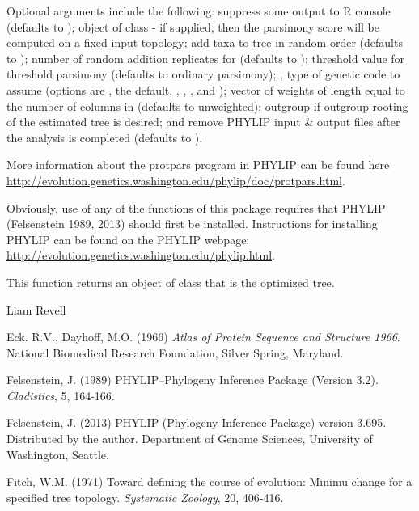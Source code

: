 \documentclass[a4paper]{book}
\begin{document}
\begin{Details}\relax
Optional arguments include the following:  suppress some output to R console (defaults to );  object of class  - if supplied, then the parsimony score will be computed on a fixed input topology;  add taxa to tree in random order (defaults to );  number of random addition replicates for  (defaults to );  threshold value for threshold parsimony (defaults to ordinary parsimony); , type of genetic code to assume (options are , the default, , , , and );  vector of weights of length equal to the number of columns in  (defaults to unweighted);  outgroup if outgroup rooting of the estimated tree is desired; and  remove PHYLIP input \& output files after the analysis is completed (defaults to ).

More information about the protpars program in PHYLIP can be found here \url{http://evolution.genetics.washington.edu/phylip/doc/protpars.html}.

Obviously, use of any of the functions of this package requires that PHYLIP (Felsenstein 1989, 2013) should first be installed. Instructions for installing PHYLIP can be found on the PHYLIP webpage: \url{http://evolution.genetics.washington.edu/phylip.html}.
\end{Details}
%
\begin{Value}
This function returns an object of class  that is the optimized tree.
\end{Value}
%
\begin{Author}\relax
Liam Revell 
\end{Author}
%
\begin{References}\relax
Eck. R.V., Dayhoff, M.O. (1966) \emph{Atlas of Protein Sequence and Structure 1966}. National Biomedical Research Foundation, Silver Spring, Maryland.

Felsenstein, J. (1989) PHYLIP--Phylogeny Inference Package (Version 3.2). \emph{Cladistics}, 5, 164-166.

Felsenstein, J. (2013) PHYLIP (Phylogeny Inference Package) version 3.695. Distributed by the author. Department of Genome Sciences, University of Washington, Seattle.

Fitch, W.M. (1971) Toward defining the course of evolution: Minimu change for a specified tree topology. \emph{Systematic Zoology}, 20, 406-416.
\end{References}
\end{document}
